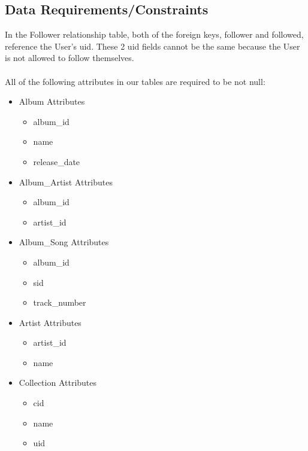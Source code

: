 \documentclass[12pt]{article}
\begin{document}
    \subsection{Data Requirements/Constraints}
    In the Follower relationship table, both of the foreign keys, follower and followed, reference the User's uid. These 2 uid fields cannot be the same because the User is not allowed to follow themselves.
    \\~\\
    All of the following attributes in our tables are required to be not null:

    \begin{itemize}
        \item Album Attributes
            \begin{itemize}
                \item album\_id
                \item name
                \item release\_date
            \end{itemize}
        \item Album\_Artist Attributes
            \begin{itemize}
                \item album\_id
                \item artist\_id
            \end{itemize}
        \item Album\_Song Attributes
            \begin{itemize}
                \item album\_id
                \item sid
                \item track\_number
            \end{itemize}
        \item Artist Attributes
            \begin{itemize}
                \item artist\_id
                \item name
            \end{itemize}
        \item Collection Attributes
            \begin{itemize}
                \item cid
                \item name
                \item uid
            \end{itemize}

\end{itemize}
\end{document}
